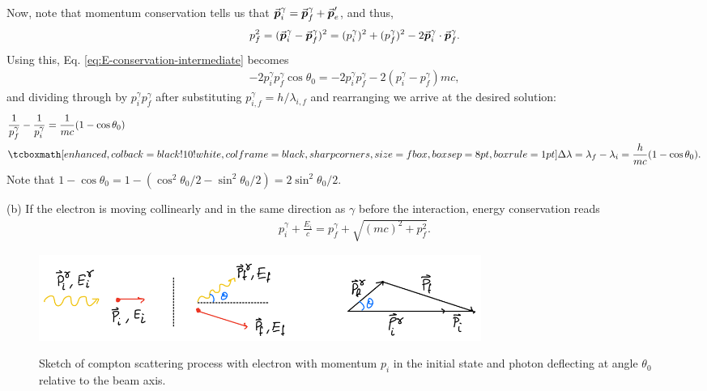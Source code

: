 {Now, note that momentum conservation tells us that $\va*{p}_{i}^{\gamma} = \va*{p}_{f}^{\gamma} + \va*{p}_{e}'$, and thus,
\begin{eqnarray}
    p_{f}^2 = (\va*{p}_{i}^{\gamma} - \va*{p}_{f}^{\gamma})^2 = (p_{i}^{\gamma})^2 + (p_{f}^{\gamma})^2 - 2 \va*{p}_{i}^{\gamma} \cdot \va*{p}_{f}^{\gamma}
.\end{eqnarray}
Using this, Eq. \ref{eq:E-conservation-intermediate} becomes
\begin{eqnarray}
    - 2 p_{i}^{\gamma} p_{f}^{\gamma} \cos{\theta_0} = -2 p_{i}^{\gamma} p_{f}^{\gamma} - 2 (p_{i}^{\gamma} - p_{f}^{\gamma}) mc
,\end{eqnarray}
and dividing through by $p_{i}^{\gamma} p_{f}^{\gamma}$ after substituting $p_{i,f}^{\gamma} = h/\lambda_{i,f}$ and rearranging we arrive at the desired solution:
\begin{eqnarray}
    \label{eq:1a-result}
    \begin{aligned}
        &\frac{1}{p_{f}^{\gamma}} - \frac{1}{p_{i}^{\gamma}} = \frac{1}{mc}(1 - \cos{\theta_0}) \\
        &\eqbox{ \Delta \lambda = \lambda_{f} - \lambda_{i} = \frac{h}{mc} (1 - \cos{\theta_0}) }
    .\end{aligned}
\end{eqnarray}
Note that $1 - \cos{\theta_0} = 1 - (\cos^2{\theta_0/2} - \sin^2{\theta_0/2}) = 2 \sin^2{\theta_0/2}$.



(b) If the electron is moving collinearly and in the same direction as $\gamma$ before the interaction, energy conservation reads
\begin{eqnarray}
    p_{i}^{\gamma} + \frac{E_{i}}{c} = p_{f}^{\gamma} + \sqrt{(mc)^2 + p_{f}^2}
.\end{eqnarray}

\begin{figure}[h!tb]
    \centering
    \includegraphics[width=0.7\textwidth]{prob1b.jpeg}
    \label{fig:prob1b}
    \caption{Sketch of compton scattering process with electron with momentum $p_{i}$ in the initial state and photon deflecting at angle $\theta_0$ relative to the beam axis.}
\end{figure}


}
